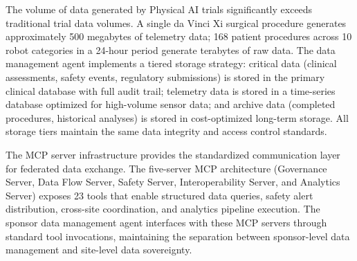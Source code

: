 The volume of data generated by Physical AI trials significantly exceeds traditional trial
data volumes. A single da Vinci Xi surgical procedure generates approximately 500 megabytes
of telemetry data; 168 patient procedures across 10 robot categories in a 24-hour period
generate terabytes of raw data. The data management agent implements a tiered storage
strategy: critical data (clinical assessments, safety events, regulatory submissions) is
stored in the primary clinical database with full audit trail; telemetry data is stored
in a time-series database optimized for high-volume sensor data; and archive data (completed
procedures, historical analyses) is stored in cost-optimized long-term storage. All storage
tiers maintain the same data integrity and access control standards.

The MCP server infrastructure \cite{mcp-repo, mcp-protocol} provides the standardized
communication layer for federated data exchange. The five-server MCP architecture
(Governance Server, Data Flow Server, Safety Server, Interoperability Server, and
Analytics Server) exposes 23 tools that enable structured data queries, safety alert
distribution, cross-site coordination, and analytics pipeline execution. The sponsor
data management agent interfaces with these MCP servers through standard tool invocations,
maintaining the separation between sponsor-level data management and site-level data
sovereignty.

